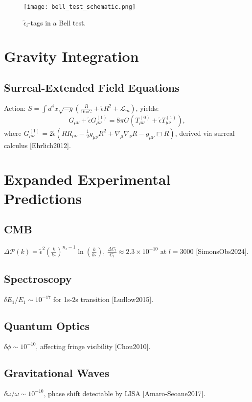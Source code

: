 \documentclass{article}
\begin{document}
\begin{figure}[h]
    \centering
    \texttt{[image: bell\_test\_schematic.png]}
    \caption{\(\tilde{\epsilon}_i\)-tags in a Bell test.}
    \label{fig:bell_test}
\end{figure}

\section{Gravity Integration}
\subsection{Surreal-Extended Field Equations}
Action: \(S = \int d^4x \sqrt{-g} \left( \frac{R}{16\pi G} + \tilde{\epsilon} R^2 + \mathcal{L}_m \right)\), yields:
\[ G_{\mu\nu} + \tilde{\epsilon} G_{\mu\nu}^{(1)} = 8\pi G (T_{\mu\nu}^{(0)} + \tilde{\epsilon} T_{\mu\nu}^{(1)}), \]
where \(G_{\mu\nu}^{(1)} = 2\tilde{\epsilon} (R R_{\mu\nu} - \frac{1}{2} g_{\mu\nu} R^2 + \nabla_\mu \nabla_\nu R - g_{\mu\nu} \Box R)\), derived via surreal calculus [Ehrlich2012].

\section{Expanded Experimental Predictions}
\subsection{CMB}
\(\Delta \mathcal{P}(k) = \tilde{\epsilon}^2 \left( \frac{k}{k_*} \right)^{n_s-1} \ln \left( \frac{k}{k_*} \right)\), \(\frac{\Delta C_l}{C_l} \approx 2.3 \times 10^{-10}\) at \(l = 3000\) [SimonsObs2024].

\subsection{Spectroscopy}
\(\delta E_1 / E_1 \sim 10^{-17}\) for 1s-2s transition [Ludlow2015].

\subsection{Quantum Optics}
\(\delta \phi \sim 10^{-10}\), affecting fringe visibility [Chou2010].

\subsection{Gravitational Waves}
\(\delta \omega / \omega \sim 10^{-10}\), phase shift detectable by LISA [Amaro-Seoane2017].
\end{document}
